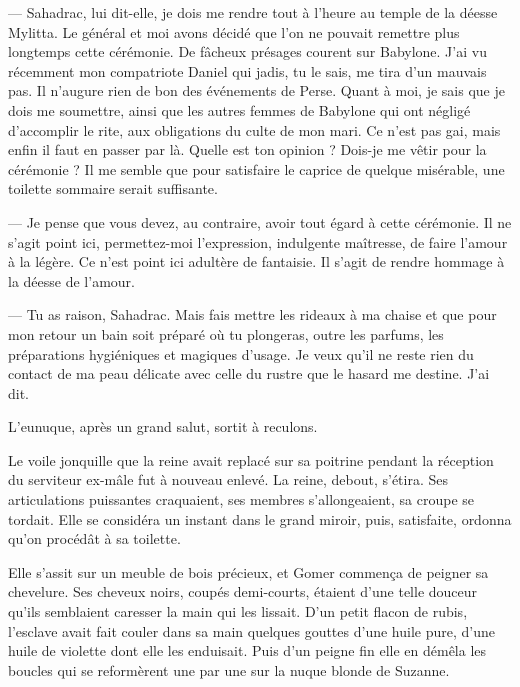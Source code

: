\documentclass[a4paper, 11pt, oneside, polutonikogreek, french]{article}
\begin{document}
\bigskip
\centerline{\EightStarTaper}
\centerline{\EightStarTaper\EightStarTaper}
\bigskip

--- Sahadrac, lui dit-elle, je dois me rendre tout à l'heure au temple de la déesse Mylitta. Le général et moi avons décidé que l'on ne pouvait remettre plus longtemps cette cérémonie. De fâcheux présages courent sur Babylone. J'ai vu récemment mon compatriote Daniel qui jadis, tu le sais, me tira d'un mauvais pas. Il n'augure rien de bon des événements de Perse. Quant à moi, je sais que je dois me soumettre, ainsi que les autres femmes de Babylone qui ont négligé d'accomplir le rite, aux obligations du culte de mon mari. Ce n'est pas gai, mais enfin il faut en passer par là. Quelle est ton opinion ? Dois-je me vêtir pour la cérémonie ? Il me semble que pour satisfaire le caprice de quelque misérable, une toilette sommaire serait suffisante.

--- Je pense que vous devez, au contraire, avoir tout égard à cette cérémonie. Il ne s'agit point ici, permettez-moi l'expression, indulgente maîtresse, de faire l'amour à la légère. Ce n'est point ici adultère de fantaisie. Il s'agit de rendre hommage à la déesse de l'amour.

--- Tu as raison, Sahadrac. Mais fais mettre les rideaux à ma chaise et que pour mon retour un bain soit préparé où tu plongeras, outre les parfums, les préparations hygiéniques et magiques d'usage. Je veux qu'il ne reste rien du contact de ma peau délicate avec celle du rustre que le hasard me destine. J'ai dit.

L'eunuque, après un grand salut, sortit à reculons.

\bigskip
\centerline{\EightStarTaper}
\centerline{\EightStarTaper\EightStarTaper}
\bigskip

Le voile jonquille que la reine avait replacé sur sa poitrine pendant la réception du serviteur ex-mâle fut à nouveau enlevé. La reine, debout, s'étira. Ses articulations puissantes craquaient, ses membres s'allongeaient, sa croupe se tordait. Elle se considéra un instant dans le grand miroir, puis, satisfaite, ordonna qu'on procédât à sa toilette.

Elle s'assit sur un meuble de bois précieux, et Gomer commença de peigner sa chevelure. Ses cheveux noirs, coupés demi-courts, étaient d'une telle douceur qu'ils semblaient caresser la main qui les lissait. D'un petit flacon de rubis, l'esclave avait fait couler dans sa main quelques gouttes d'une huile pure, d'une huile de violette dont elle les enduisait. Puis d'un peigne fin elle en démêla les boucles qui se reformèrent une par une sur la nuque blonde de Suzanne.
\end{document}
